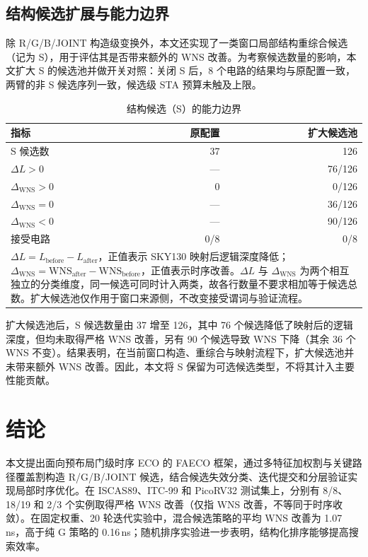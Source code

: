 \documentclass[twocolumn,10pt,fontset=windows]{ctexart}
\begin{document}
\subsection{结构候选扩展与能力边界}\label{sec:s_boundary}

除 R/G/B/JOINT 构造级变换外，本文还实现了一类窗口局部结构重综合候选（记为 S），用于评估其是否带来额外的 WNS 改善。为考察候选数量的影响，本文扩大 S 的候选池并做开关对照：关闭 S 后，8 个电路的结果均与原配置一致，两臂的非 S 候选序列一致，候选级 STA 预算未触及上限。

\begin{table}[H]
\centering
\caption{结构候选（S）的能力边界}
\label{tab:s_boundary}
\footnotesize
\setlength{\tabcolsep}{8pt}
\begin{tabular}{lrr}
\toprule
\textbf{指标} & \textbf{原配置} & \textbf{扩大候选池} \\
\midrule
S 候选数 & 37 & 126 \\
$\Delta L>0$ & — & 76/126 \\
$\Delta_{\mathrm{WNS}}>0$ & 0 & 0/126 \\
$\Delta_{\mathrm{WNS}}=0$ & — & 36/126 \\
$\Delta_{\mathrm{WNS}}<0$ & — & 90/126 \\
接受电路 & 0/8 & 0/8 \\
\bottomrule
\multicolumn{3}{p{0.9\columnwidth}}{\footnotesize $\Delta L=L_{\mathrm{before}}-L_{\mathrm{after}}$，正值表示 SKY130 映射后逻辑深度降低；$\Delta_{\mathrm{WNS}}=\mathrm{WNS}_{\mathrm{after}}-\mathrm{WNS}_{\mathrm{before}}$，正值表示时序改善。$\Delta L$ 与 $\Delta_{\mathrm{WNS}}$ 为两个相互独立的分类维度，同一候选可同时计入两类，故各行数量不要求相加等于候选总数。扩大候选池仅作用于窗口来源侧，不改变接受谓词与验证流程。}\\
\end{tabular}
\end{table}

扩大候选池后，S 候选数量由 37 增至 126，其中 76 个候选降低了映射后的逻辑深度，但均未取得严格 WNS 改善，另有 90 个候选导致 WNS 下降（其余 36 个 WNS 不变）。结果表明，在当前窗口构造、重综合与映射流程下，扩大候选池并未带来额外 WNS 改善。因此，本文将 S 保留为可选候选类型，不将其计入主要性能贡献。

\section{结论}\label{sec:conclusion}

本文提出面向预布局门级时序 ECO 的 FAECO 框架，通过多特征加权割与关键路径覆盖割构造 R/G/B/JOINT 候选，结合候选失效分类、迭代提交和分层验证实现局部时序优化。在 ISCAS89、ITC-99 和 PicoRV32 测试集上，分别有 8/8、18/19 和 2/3 个实例取得严格 WNS 改善（仅指 WNS 改善，不等同于时序收敛）。在固定权重、20 轮迭代实验中，混合候选策略的平均 WNS 改善为 1.07\,ns，高于纯 G 策略的 0.16\,ns；随机排序实验进一步表明，结构化排序能够提高搜索效率。
\end{document}
